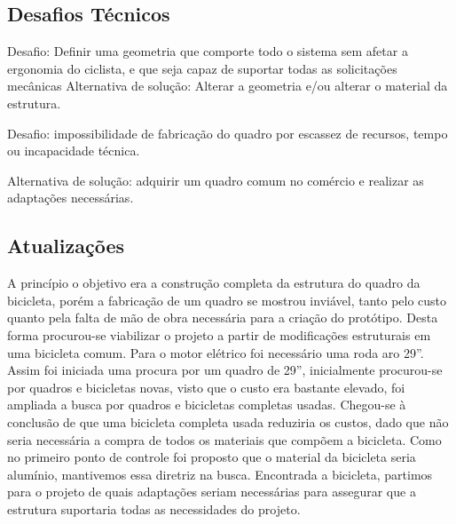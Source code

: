 \clearpage

	
	
	
	\subsection{Desafios Técnicos}
	Desafio: Definir uma geometria que comporte todo o sistema sem afetar a ergonomia do ciclista, e que seja capaz de suportar todas as solicitações mecânicas
Alternativa de solução: Alterar a geometria e/ou alterar o material da estrutura.

Desafio: impossibilidade de fabricação do quadro  por escassez de recursos, tempo ou incapacidade técnica.

Alternativa de solução: adquirir um quadro comum no comércio e realizar as adaptações necessárias.

	\subsection{Atualizações}
	A princípio o objetivo era a construção completa da estrutura do quadro da bicicleta, porém a fabricação de um quadro se mostrou inviável, tanto pelo custo quanto pela falta de mão de obra necessária para a criação do protótipo. Desta forma procurou-se viabilizar o projeto a partir de modificações estruturais em uma bicicleta comum. 
	Para o motor elétrico foi necessário uma roda aro 29”. Assim foi iniciada uma procura por um quadro de 29”, inicialmente procurou-se por quadros e bicicletas novas, visto que o custo era bastante elevado, foi ampliada a busca por quadros e bicicletas completas usadas. Chegou-se à conclusão de que uma bicicleta completa usada reduziria os custos, dado que não seria necessária a compra de todos os materiais que compõem a bicicleta. 
	Como no primeiro ponto de controle foi proposto que o material da bicicleta seria alumínio, mantivemos essa diretriz na busca. Encontrada a bicicleta, partimos para o projeto de quais adaptações seriam necessárias para assegurar que a estrutura suportaria todas as necessidades do projeto.
	
